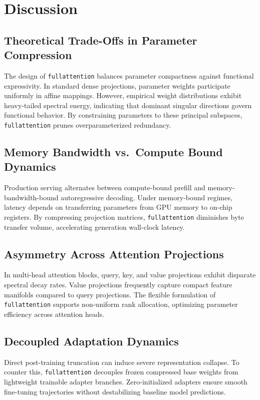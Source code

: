 \section{Discussion}

\subsection{Theoretical Trade-Offs in Parameter Compression}
The design of \texttt{fullattention} balances parameter compactness against functional expressivity. In standard dense projections, parameter weights participate uniformly in affine mappings. However, empirical weight distributions exhibit heavy-tailed spectral energy, indicating that dominant singular directions govern functional behavior. By constraining parameters to these principal subspaces, \texttt{fullattention} prunes overparameterized redundancy.

\subsection{Memory Bandwidth vs.\ Compute Bound Dynamics}
Production serving alternates between compute-bound prefill and memory-bandwidth-bound autoregressive decoding. Under memory-bound regimes, latency depends on transferring parameters from GPU memory to on-chip registers. By compressing projection matrices, \texttt{fullattention} diminishes byte transfer volume, accelerating generation wall-clock latency.

\subsection{Asymmetry Across Attention Projections}
In multi-head attention blocks, query, key, and value projections exhibit disparate spectral decay rates. Value projections frequently capture compact feature manifolds compared to query projections. The flexible formulation of \texttt{fullattention} supports non-uniform rank allocation, optimizing parameter efficiency across attention heads.

\subsection{Decoupled Adaptation Dynamics}
Direct post-training truncation can induce severe representation collapse. To counter this, \texttt{fullattention} decouples frozen compressed base weights from lightweight trainable adapter branches. Zero-initialized adapters ensure smooth fine-tuning trajectories without destabilizing baseline model predictions.

